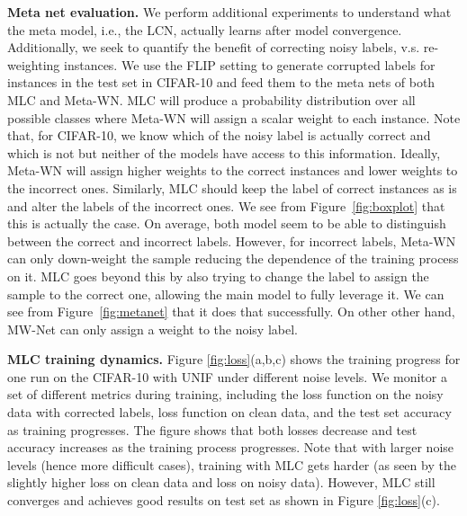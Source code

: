 \textbf{Meta net evaluation.} We perform additional experiments to understand what the meta model, i.e., the LCN, actually learns
after model convergence. Additionally, we seek to quantify the benefit of correcting noisy labels, v.s. re-weighting instances.  We use the \textsf{FLIP} setting to
generate corrupted labels for instances in the test set in CIFAR-10
and feed them to the meta nets of both MLC and Meta-WN. MLC will produce a probability distribution over all possible classes where Meta-WN will assign a scalar weight to each instance.
Note that, for CIFAR-10, we know which of the noisy label is actually correct and which is not but neither of the models have access to this information. Ideally, Meta-WN will assign higher weights to the correct instances and lower weights to the incorrect ones. Similarly, MLC should keep the label of correct instances as is and alter the labels of the incorrect ones. We see from Figure~\ref{fig:boxplot} that this is actually the case. On average, both model seem to be able to distinguish between the correct and incorrect labels. However, for incorrect labels, Meta-WN can only down-weight the sample reducing the dependence of the training process on it. MLC goes beyond this by also trying to change the label to assign the sample to the correct one, allowing the main model to fully leverage it. We can see from Figure~\ref{fig:metanet} that it does that successfully. On other other hand, MW-Net can only assign a weight to the noisy label. 


\textbf{MLC training dynamics.} Figure \ref{fig:loss}(a,b,c) shows the training progress for one run
on the CIFAR-10 with \textsf{UNIF} under different noise levels. We
monitor a set of different metrics during training, including the loss
function on the noisy data with corrected labels, loss function
on clean data, and the test set accuracy as training progresses. The
figure shows that both losses decrease and test accuracy increases as
the training process progresses. Note that with larger noise levels
(hence more difficult cases), training with MLC gets harder (as seen
by the slightly higher loss on clean data and loss on noisy
data). However, MLC still converges and achieves
good results on test set as shown in Figure \ref{fig:loss}(c). 


